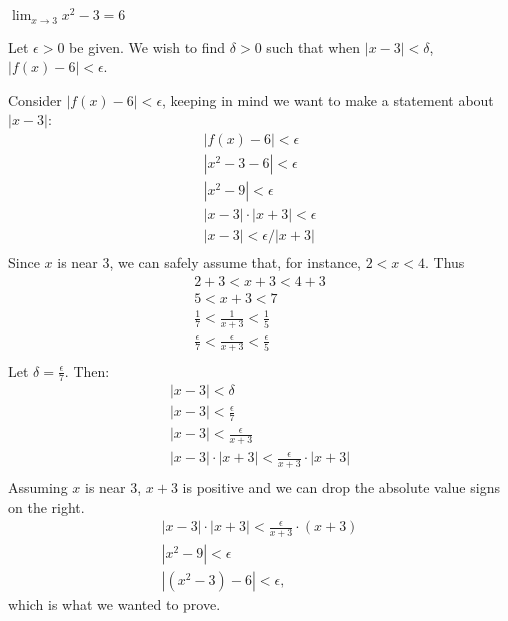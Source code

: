 {$\displaystyle \lim_{x\to 3} x^2-3 = 6$}
{Let $\epsilon >0$ be given. We wish to find $\delta >0$ such that when $|x-3|<\delta$, $|f(x)-6|<\epsilon$. 

Consider $|f(x)-6|<\epsilon$, keeping in  mind we want to make a statement about $|x-3|$:
\begin{gather*}
|f(x) -6 | < \epsilon \\
|x^2-3 -6 |<\epsilon \\
| x^2-9 | < \epsilon \\
| x-3 |\cdot|x+3| < \epsilon \\
| x-3 | < \epsilon/|x+3| \\
\end{gather*}
Since $x$ is near 3, we can safely assume that, for instance, $2<x<4$. Thus
\begin{gather*}
2+3<x+3<4+3 \\
5 < x+3 < 7 \\
\frac{1}{7} < \frac{1}{x+3} < \frac{1}{5} \\
\frac{\epsilon}{7} < \frac{\epsilon}{x+3} < \frac{\epsilon}{5} \\
\end{gather*}
Let $\delta =\frac{\epsilon}{7}$. Then:
\begin{gather*}
|x-3|<\delta \\
|x-3| < \frac{\epsilon}7\\
|x-3| < \frac{\epsilon}{x+3}\\
|x-3|\cdot|x+3| < \frac{\epsilon}{x+3}\cdot|x+3|\\
\end{gather*}
Assuming $x$ is near 3, $x+3$ is positive and we can drop the absolute value signs on the right.
\begin{gather*}
|x-3|\cdot|x+3| < \frac{\epsilon}{x+3}\cdot(x+3)\\
|x^2-9| < \epsilon\\
|(x^2-3) - 6| < \epsilon,
\end{gather*}
which is what we wanted to prove.
}


